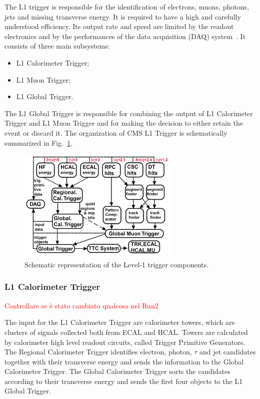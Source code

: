 The L1 trigger is responsible for the identification of electrons, muons, photons, jets and missing transverse energy. It is required to have a high and carefully understood efficiency. Its output rate and speed are limited by the readout electronics and by the performances of the data
acquisition (DAQ) system~\cite{Cittolin:578006}. It consists of three main subsystems:
\begin{itemize}
\item L1 Calorimeter Trigger;
\item L1 Muon Trigger;
\item L1 Global Trigger.
\end{itemize}
The L1 Global Trigger is responsible for combining the output of L1 Calorimeter
Trigger and L1 Muon Trigger and for making the decision to either retain the event or discard it. The organization of CMS L1 Trigger is schematically summarized in Fig.~\ref{fig:trigL1}.
\begin{figure}[htb]
\centering
\includegraphics[width=0.7\textwidth]{images/trigL1.png}
\caption{Schematic representation of the Level-1 trigger components.}\label{fig:trigL1}
\end{figure}

\subsubsection{L1 Calorimeter Trigger}
\textcolor{red}{Controllare se è stato cambiato qualcosa nel Run2}

The input for the L1 Calorimeter Trigger are calorimeter towers, which are clusters of signals collected both from ECAL and HCAL. Towers are calculated by calorimeter high level readout circuits, called Trigger Primitive Generators. The Regional Calorimeter Trigger identifies electron, photon, $\tau$ and jet candidates together with their transverse energy and sends the information to the Global Calorimeter Trigger. The Global Calorimeter Trigger sorts the candidates according to their transverse energy and sends the first four objects to the L1 Global Trigger.

